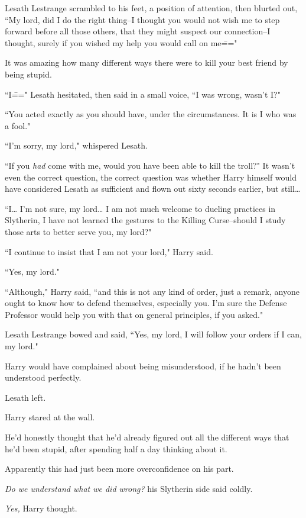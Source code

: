 Lesath Lestrange scrambled to his feet, a position of attention, then blurted out, ``My lord, did I do the right thing\---I thought you would not wish me to step forward before all those others, that they might suspect our connection\---I thought, surely if you wished my help you would call on me\==="

It was amazing how many different ways there were to kill your best friend by being stupid.

``I\===" Lesath hesitated, then said in a small voice, ``I was wrong, wasn't I?"

``You acted exactly as you should have, under the circumstances. It is I who was a fool."

``I'm sorry, my lord," whispered Lesath.

``If you \emph{had} come with me, would you have been able to kill the troll?" It wasn't even the correct question, the correct question was whether Harry himself would have considered Lesath as sufficient and flown out sixty seconds earlier, but still{\ldots}

``I{\ldots} I'm not sure, my lord{\ldots} I am not much welcome to dueling practices in Slytherin, I have not learned the gestures to the Killing Curse\---should I study those arts to better serve you, my lord?"

``I continue to insist that I am not your lord," Harry said.

``Yes, my lord."

``Although," Harry said, ``and this is not any kind of order, just a remark, anyone ought to know how to defend themselves, especially you. I'm sure the Defense Professor would help you with that on general principles, if you asked."

Lesath Lestrange bowed and said, ``Yes, my lord, I will follow your orders if I can, my lord."

Harry would have complained about being misunderstood, if he hadn't been understood perfectly.

Lesath left.

Harry stared at the wall.

He'd honestly thought that he'd already figured out all the different ways that he'd been stupid, after spending half a day thinking about it.

Apparently this had just been more overconfidence on his part.

\emph{Do we understand what we did wrong?} his Slytherin side said coldly.

\emph{Yes,} Harry thought.

